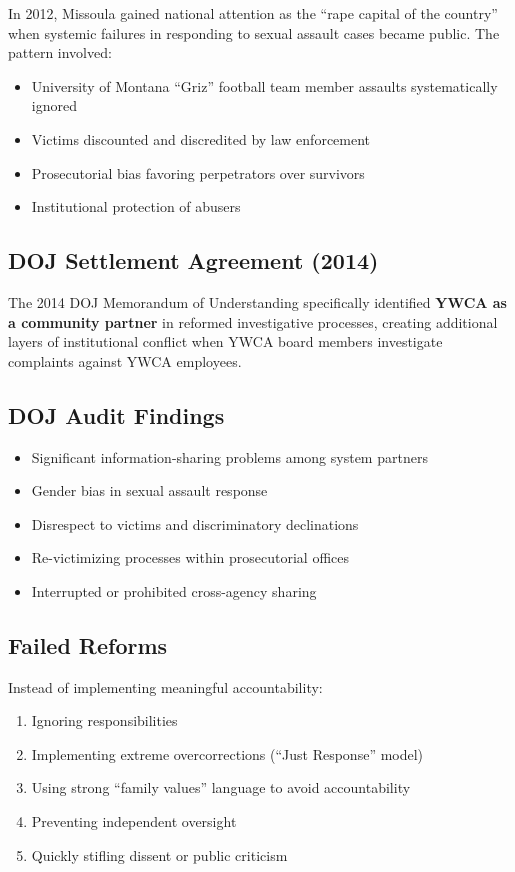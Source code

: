 \documentclass[12pt,oneside]{article}
\begin{document}
In 2012, Missoula gained national attention as the ``rape capital of the country'' when systemic failures in responding to sexual assault cases became public. The pattern involved:

\begin{itemize}
\item University of Montana ``Griz'' football team member assaults systematically ignored
\item Victims discounted and discredited by law enforcement
\item Prosecutorial bias favoring perpetrators over survivors
\item Institutional protection of abusers
\end{itemize}

\subsection*{DOJ Settlement Agreement (2014)}

The 2014 DOJ Memorandum of Understanding specifically identified \textbf{YWCA as a community partner} in reformed investigative processes, creating additional layers of institutional conflict when YWCA board members investigate complaints against YWCA employees.

\subsection*{DOJ Audit Findings}

\begin{itemize}
\item Significant information-sharing problems among system partners
\item Gender bias in sexual assault response
\item Disrespect to victims and discriminatory declinations
\item Re-victimizing processes within prosecutorial offices
\item Interrupted or prohibited cross-agency sharing
\end{itemize}

\subsection*{Failed Reforms}

Instead of implementing meaningful accountability:
\begin{enumerate}
\item Ignoring responsibilities
\item Implementing extreme overcorrections (``Just Response'' model)
\item Using strong ``family values'' language to avoid accountability
\item Preventing independent oversight
\item Quickly stifling dissent or public criticism
\end{enumerate}
\end{document}

